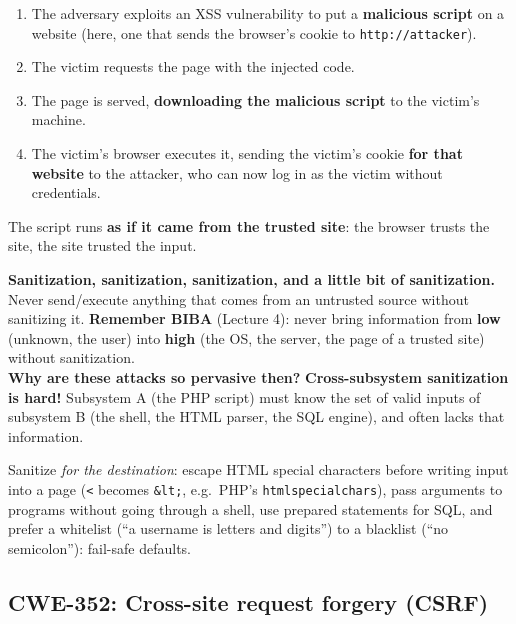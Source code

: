 \begin{defnbox}[title={How XSS attacks a victim}]
\begin{enumerate}
  \item The adversary exploits an XSS vulnerability to put a \textbf{malicious script} on a
        website (here, one that sends the browser's cookie to \texttt{http://attacker}).
  \item The victim requests the page with the injected code.
  \item The page is served, \textbf{downloading the malicious script} to the victim's machine.
  \item The victim's browser executes it, sending the victim's cookie \textbf{for that website} to
        the attacker, who can now log in as the victim without credentials.
\end{enumerate}
The script runs \textbf{as if it came from the trusted site}: the browser trusts the site, the site
trusted the input.
\end{defnbox}

\begin{propbox}[title={How to avoid injection?}]
\textbf{Sanitization, sanitization, sanitization, and a little bit of sanitization.} Never
send/execute anything that comes from an untrusted source without sanitizing it. \textbf{Remember
BIBA} (Lecture 4): never bring information from \textbf{low} (unknown, the user) into \textbf{high}
(the OS, the server, the page of a trusted site) without sanitization. \\
\textbf{Why are these attacks so pervasive then?} \textbf{Cross-subsystem sanitization is hard!}
Subsystem A (the PHP script) must know the set of valid inputs of subsystem B (the shell, the HTML
parser, the SQL engine), and often lacks that information.
\end{propbox}

\begin{rembox}[title={In practice (not in the slides)}]
Sanitize \emph{for the destination}: escape HTML special characters before writing input into a
page (\texttt{<} becomes \texttt{\&lt;}, e.g.\ PHP's \texttt{htmlspecialchars}), pass arguments to
programs without going through a shell, use prepared statements for SQL, and prefer a whitelist
(``a username is letters and digits'') to a blacklist (``no semicolon''): fail-safe defaults.
\end{rembox}

\subsection{CWE-352: Cross-site request forgery (CSRF)}

